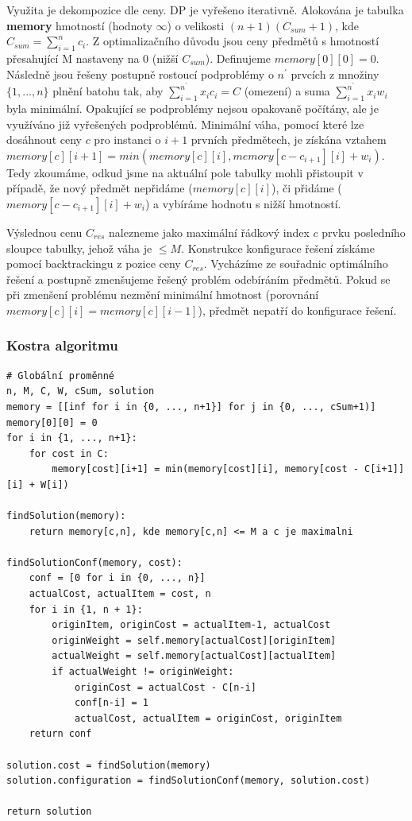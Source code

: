 \documentclass[12pt]{article}
\begin{document}
Využita je dekompozice dle ceny. DP je vyřešeno iterativně. Alokována je tabulka \textbf{memory} hmotností (hodnoty $\infty$) o velikosti $(n+1)(C_{sum}+1)$, kde $C_{sum}=\sum_{i=1}^{n}c_{i}$. Z optimalizačního důvodu jsou ceny předmětů s hmotností přesahující M nastaveny na 0 (nižší $C_{sum}$). Definujeme $memory[0][0]=0$. Následně jsou řešeny postupně rostoucí podproblémy o $n^{'}$ prvcích z množiny $\{1,...,n\}$ plnění batohu tak, aby $\sum_{i=1}^{n^{'}} x_ic_i = C$ (omezení) a suma $\sum_{i=1}^{n^{'}} x_iw_i$ byla minimální. Opakující se podproblémy nejsou opakovaně počítány, ale je využíváno již vyřešených podproblémů. Minimální váha, pomocí které lze dosáhnout ceny $c$ pro instanci o $i+1$ prvních předmětech, je získána vztahem $memory[c][i+1] = min(memory[c][i], memory[c-c_{i+1}][i] + w_{i})$. Tedy zkoumáme, odkud jsme na aktuální pole tabulky mohli přistoupit v případě, že nový předmět nepřidáme ($memory[c][i]$), či přidáme ($memory[c-c_{i+1}][i] + w_{i}$) a vybíráme hodnotu s nižší hmotností.

Výslednou cenu $C_{res}$ nalezneme jako maximální řádkový index $c$ prvku posledního sloupce tabulky, jehož váha je $\leq M$. Konstrukce konfigurace řešení získáme pomocí backtrackingu z pozice ceny $C_{res}$. Vycházíme ze souřadnic optimálního řešení a postupně zmenšujeme řešený problém odebíráním předmětů. Pokud se při zmenšení problému nezmění minimální hmotnost (porovnání $memory[c][i] = memory[c][i-1]$), předmět nepatří do konfigurace řešení.

\newpage

\subsubsection{Kostra algoritmu}

\begin{listing}[ht]
    \begin{verbatim}
# Globální proměnné
n, M, C, W, cSum, solution
memory = [[inf for i in {0, ..., n+1}] for j in {0, ..., cSum+1)]
memory[0][0] = 0
for i in {1, ..., n+1}:
    for cost in C:
        memory[cost][i+1] = min(memory[cost][i], memory[cost - C[i+1]][i] + W[i])

findSolution(memory):
    return memory[c,n], kde memory[c,n] <= M a c je maximalni

findSolutionConf(memory, cost):
    conf = [0 for i in {0, ..., n}]
    actualCost, actualItem = cost, n
    for i in {1, n + 1}:
        originItem, originCost = actualItem-1, actualCost
        originWeight = self.memory[actualCost][originItem]
        actualWeight = self.memory[actualCost][actualItem]
        if actualWeight != originWeight:
            originCost = actualCost - C[n-i]
            conf[n-i] = 1
            actualCost, actualItem = originCost, originItem
    return conf

solution.cost = findSolution(memory)
solution.configuration = findSolutionConf(memory, solution.cost)

return solution

    \end{verbatim}
\end{listing}
\end{document}
